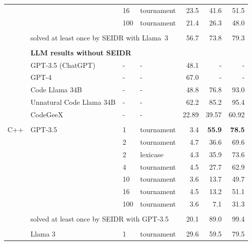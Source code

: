 \begin{table}[t]
\begin{tabular}{llllrrr}
       &        & 16  &         tournament &    23.5 &     41.6 &      51.5 \\
       &        & 100 &         tournament &    21.4 &     26.3 &      48.0  \\[1pt]
\cline{3-7}\\[-8pt]
       & \multicolumn{3}{l}{solved at least once by SEIDR with Llama~3} & 56.7 &     73.8 &      79.3 \\[1pt]
\cline{2-7}\\[-8pt]
& \multicolumn{6}{l}{\textbf{LLM results without SEIDR}} \\
 & GPT-3.5 (ChatGPT) & - &  - &  48.1  &  -   &    - \\
 & GPT-4 & - &  - & 67.0   &  -   &    - \\
 & Code Llama 34B & - &  - &  48.8  &  76.8   &    93.0 \\
 & Unnatural Code Llama 34B & - &  - &  62.2  &  85.2   &    95.4 \\
 & CodeGeeX & - &  - &  22.89  &  39.57   &    60.92 \\[-2pt]
\midrule\\[-10pt]
C++    & GPT-3.5 & 1   &         tournament &     3.4 &    \textbf{ 55.9} &      \textbf{78.5} \\
       &        & 2   &         tournament &     4.7 &     36.6 &      69.6 \\
       &        & 2   &           lexicase &     4.3 &     35.9 &      73.6 \\
       &        & 4   &         tournament &     4.5 &     27.7 &      62.9 \\
       &        & 10  &         tournament &     3.6 &     13.7 &      49.7 \\
       &        & 16  &         tournament &     4.5 &     13.2 &      51.1 \\
       &        & 100 &         tournament &     3.6 &      7.1 &      31.3 \\[1pt]
\cline{3-7}\\[-8pt]
       & \multicolumn{3}{l}{solved at least once by SEIDR with GPT-3.5} & 20.1 &     89.0 &      99.4 \\[1pt]
\cline{2-7}\\[-8pt]
    &   Llama 3 & 1   &         tournament &    29.6 &     59.5 &      79.5 \\

\end{tabular}
\end{table}
